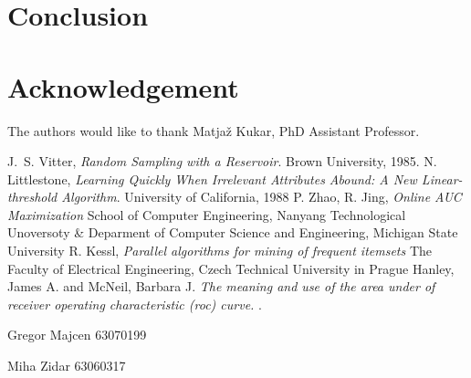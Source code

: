\documentclass[journal]{IEEEtran/IEEEtran}
\begin{document}
\section{Conclusion}

\appendices

\section*{Acknowledgement}
The authors would like to thank Matjaž Kukar, PhD Assistant Professor.


\begin{thebibliography}{1}
J.~S. Vitter, \emph{Random Sampling with a Reservoir}. \relax Brown University, 1985.
N. Littlestone, \emph{Learning Quickly When Irrelevant Attributes
Abound: A New Linear-threshold Algorithm}. \relax University of California, 1988
P. Zhao, R. Jing, \emph{Online AUC Maximization} \relax School of Computer Engineering, Nanyang Technological Unoversoty \& Deparment of Computer Science and Engineering, Michigan State University
R. Kessl, \emph{Parallel algorithms for mining of frequent itemsets} \relax The Faculty of Electrical Engineering, Czech Technical University in Prague
Hanley, James A. and McNeil, Barbara J. \emph{The meaning and
use of the area under of receiver operating characteristic
(roc) curve.} .

\end{thebibliography}

\newpage

\begin{IEEEbiography}{Gregor Majcen}
63070199
\end{IEEEbiography}

\begin{IEEEbiography}{Miha Zidar}
63060317
\end{IEEEbiography}
\end{document}
